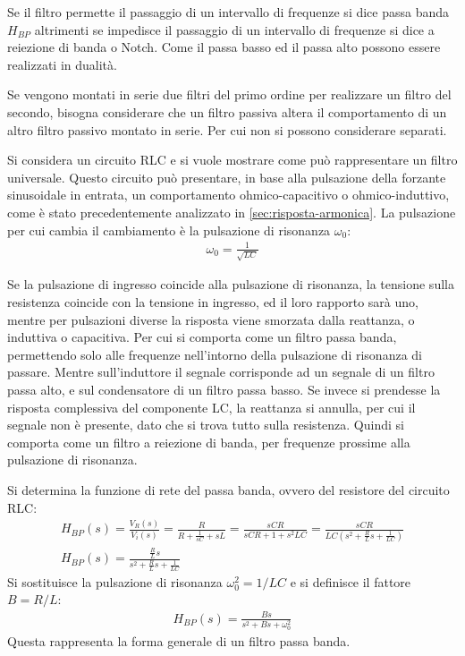 \documentclass{article}
\numberwithin{equation}{subsection}
\begin{document}
Se il filtro permette il passaggio di un intervallo di frequenze si dice passa banda $H_{BP}$ altrimenti se impedisce il passaggio di un intervallo di frequenze si dice 
a reiezione di banda o Notch. Come il passa basso ed il passa alto possono essere realizzati in dualità. 

Se vengono montati in serie due filtri del primo ordine per realizzare un filtro del secondo, bisogna considerare che un filtro passiva altera il comportamento di 
un altro filtro passivo montato in serie. Per cui non si possono considerare separati. 

Si considera un circuito RLC e si vuole mostrare come può rappresentare un filtro universale. Questo circuito può presentare, in base alla pulsazione della forzante 
sinusoidale in entrata, un comportamento ohmico-capacitivo o ohmico-induttivo, come è stato precedentemente analizzato in \ref{sec:risposta-armonica}. 
La pulsazione per cui cambia il cambiamento è la pulsazione di risonanza $\omega_0$:
\begin{gather*}
    \omega_0=\displaystyle\frac{1}{\sqrt{LC}}
\end{gather*}

Se la pulsazione di ingresso coincide alla pulsazione di risonanza, la tensione sulla resistenza coincide con la tensione in ingresso, ed il loro rapporto sarà uno, mentre 
per pulsazioni diverse la risposta viene smorzata dalla reattanza, o induttiva o capacitiva. Per cui si comporta come un filtro passa banda, permettendo solo alle 
frequenze nell'intorno della pulsazione di risonanza di passare. 
Mentre sull'induttore il segnale corrisponde ad un segnale di un filtro passa alto, e sul condensatore di un filtro passa basso. Se invece si prendesse la risposta 
complessiva del componente LC, la reattanza si annulla, per cui il segnale non è presente, dato che si trova tutto sulla resistenza. Quindi si comporta come un filtro 
a reiezione di banda, per frequenze prossime alla pulsazione di risonanza. 



Si determina la funzione di rete del passa banda, ovvero del resistore del circuito RLC:
\begin{gather*}
    H_{BP}(s)=\displaystyle\frac{V_R(s)}{V_i(s)}=\frac{R}{R+\displaystyle\frac{1}{sC}+sL}=\frac{sCR}{sCR+1+s^2LC}=\frac{sCR}{LC\left(\displaystyle s^2+\frac{R}{L}s+\frac{1}{LC}\right)}\\
    H_{BP}(s)=\displaystyle\frac{\displaystyle\frac{R}{L}s}{\displaystyle s^2+\frac{R}{L}s+\frac{1}{LC}}
\end{gather*}
Si sostituisce la pulsazione di risonanza $\omega_0^2=1/LC$ e si definisce il fattore $B=R/L$:
\begin{gather*}
    H_{BP}(s)=\displaystyle\frac{Bs}{s^2+Bs+\omega_0^2}
\end{gather*}
Questa rappresenta la forma generale di un filtro passa banda. 
\end{document}
